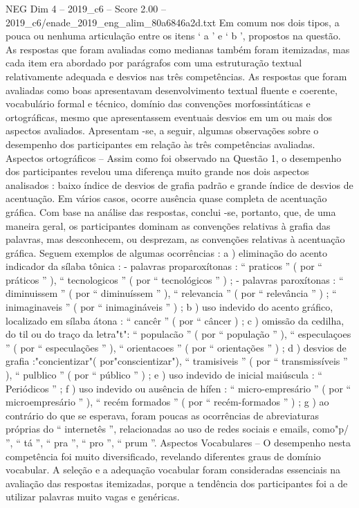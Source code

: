 \begin{textsample}{NEG Dim 4 – 2019\_c6 – Score 2.00 – 2019\_c6/enade\_2019\_eng\_alim\_80a6846a2d.txt}
Em comum nos dois tipos, a pouca ou nenhuma articulação entre os itens ‘ a ’ e ‘ b ’, propostos na questão.
As respostas que foram avaliadas como medianas também foram itemizadas, mas cada item era abordado por parágrafos com uma estruturação textual relativamente adequada e desvios nas três competências.
As respostas que foram avaliadas como boas apresentavam desenvolvimento textual fluente e coerente, vocabulário formal e técnico, domínio das convenções morfossintáticas e ortográficas, mesmo que apresentassem eventuais desvios em um ou mais dos aspectos avaliados.
Apresentam -se, a seguir, algumas observações sobre o desempenho dos participantes em relação às três competências avaliadas.
Aspectos ortográficos – Assim como foi observado na Questão 1, o desempenho dos participantes revelou uma diferença muito grande nos dois aspectos analisados : baixo índice de desvios de grafia padrão e grande índice de desvios de acentuação.
Em vários casos, ocorre ausência quase completa de acentuação gráfica.
Com base na análise das respostas, conclui -se, portanto, que, de uma maneira geral, os participantes dominam as convenções relativas à grafia das palavras, mas desconhecem, ou desprezam, as convenções relativas à acentuação gráfica.
Seguem exemplos de algumas ocorrências : a ) eliminação do acento indicador da sílaba tônica : - palavras proparoxítonas : “ praticos ” ( por “ práticos ” ), “ tecnologicos ” ( por “ tecnológicos ” ) ; - palavras paroxítonas : “ diminuissem ” ( por “ diminuíssem ” ), “ relevancia ” ( por “ relevância ” ) ; “ inimaginaveis ” ( por “ inimagináveis ” ) ; b ) uso indevido do acento gráfico, localizado em sílaba átona : “ cancêr ” ( por “ câncer ) ; c ) omissão da cedilha, do til ou do traço da letra"t": “ populacão ” ( por “ população ” ), “ especulaçoes ” ( por “ especulações ” ), “ orientacoes ” ( por “ orientações ” ) ; d ) desvios de grafia :"concientizar"( por"conscientizar"), “ tramisiveis ” ( por “ transmissíveis ” ), “ pulblico ” ( por “ público ” ) ; e ) uso indevido de inicial maiúscula : “ Periódicos ” ; f ) uso indevido ou ausência de hífen : “ micro-empresário ” ( por “ microempresário ” ), “ recém formados ” ( por “ recém-formados ” ) ; g ) ao contrário do que se esperava, foram poucas as ocorrências de abreviaturas próprias do “ internetês ”, relacionadas ao uso de redes sociais e emails, como"p/ ”, “ tá ”, “ pra ”, “ pro ”, “ prum ”.
Aspectos Vocabulares – O desempenho nesta competência foi muito diversificado, revelando diferentes graus de domínio vocabular.
A seleção e a adequação vocabular foram consideradas essenciais na avaliação das respostas itemizadas, porque a tendência dos participantes foi a de utilizar palavras muito vagas e genéricas.

\end{textsample}
